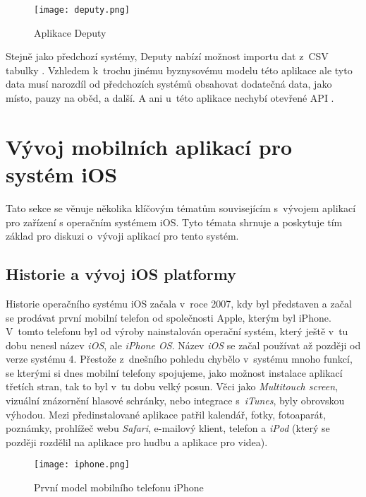 \begin{figure}[h]
	\centering
	\texttt{[image: deputy.png]}
	\caption{Aplikace Deputy \cite{deputy-time-tracking-app}}
\end{figure}

Stejně jako předchozí systémy, Deputy nabízí možnost importu dat z~CSV tabulky \cite{deputy-import-csv}. Vzhledem k~trochu jinému byznysovému modelu této aplikace ale tyto data musí narozdíl od předchozích systémů obsahovat dodatečná data, jako místo, pauzy na oběd, a další. A ani u~této aplikace nechybí otevřené API \cite{deputy-api}.

\section{Vývoj mobilních aplikací pro systém iOS}

Tato sekce se věnuje několika klíčovým tématům souvisejícím s~vývojem aplikací pro zařízení s operačním systémem iOS. Tyto témata shrnuje a poskytuje tím základ pro diskuzi o~vývoji aplikací pro tento systém.

\subsection{Historie a vývoj iOS platformy}

Historie operačního systému iOS začala v~roce 2007, kdy byl představen a začal se prodávat první mobilní telefon od společnosti Apple, kterým byl iPhone. V~tomto telefonu byl od výroby nainstalován operační systém, který ještě v~tu dobu nenesl název \emph{iOS}, ale \emph{iPhone OS}. Název \emph{iOS} se začal používat až později od verze systému 4. Přestože z~dnešního pohledu chybělo v~systému mnoho funkcí, se kterými si dnes mobilní telefony spojujeme, jako možnost instalace aplikací třetích stran, tak to byl v~tu dobu velký posun. Věci jako \emph{Multitouch screen}, vizuální znázornění hlasové schránky, nebo integrace s~\emph{iTunes}, byly obrovskou výhodou. Mezi předinstalované aplikace patřil kalendář, fotky, fotoaparát, poznámky, prohlížeč webu \emph{Safari}, e-mailový klient, telefon a \emph{iPod} (který se později rozdělil na aplikace pro hudbu a aplikace pro videa).

\begin{figure}[h]
	\centering
	\texttt{[image: iphone.png]}
	\caption{První model mobilního telefonu iPhone \cite{iphone-review}}
\end{figure}

